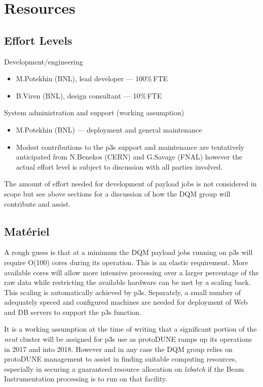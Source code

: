 \documentclass[pdftex,12pt,letter]{article}
\newcommand{\pd}{protoDUNE\xspace}
\begin{document}
\section{Resources}
\label{sec:resources}

\subsection{Effort Levels}

Development/engineering
\begin{itemize}
\item M.Potekhin (BNL), lead developer --- 100\%\,FTE
\item B.Viren (BNL), design consultant --- 10\%\,FTE
\end{itemize}

\noindent System administration and support (working assumption)

\begin{itemize}
\item M.Potekhin (BNL) --- deployment and general maintenance
\item Modest contributions to the p3s support and maintenance are tentatively anticipated from N.Benekos (CERN) and G.Savage (FNAL)
however the actual effort level is subject to discussion with all parties involved.
\end{itemize}

\noindent The amount of effort needed for development of payload jobs
is not considered in scope but see above sections for a discussion of
how the DQM group will contribute and assist.

\subsection{Mat\'eriel}

A rough guess is that at a minimum the DQM payload jobs running on p3s will require O(100)
cores during its operation.  This is an elastic requirement.  More available
cores will allow more intensive processing over a larger percentage of
the raw data while restricting the available hardware can be met by a
scaling back.  This scaling is automatically achieved by p3s. Separately,
a small number of adequately speced and configured machines are needed for
deployment of Web and DB servers to support the p3s function.  

It is a working assumption at the time of writing that a significant
portion of the \textit{neut} cluster \cite{neut} will be assigned for
p3s use as \pd ramps up its operations in 2017 and into 2018.  However
and in any case the DQM group relies on \pd management to assist in
finding suitable computing resources, especially in securing a guaranteed
resource allocation on \textit{lxbatch} if the Beam Instrumentation
processing is to run on that facility.
\end{document}
